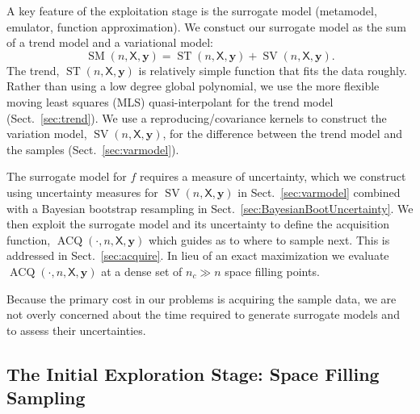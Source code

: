 \documentclass[11pt]{NSFamsart}
\DeclareMathOperator{\SURR}{SM} %
\DeclareMathOperator{\STREND}{ST} %
\DeclareMathOperator{\SVAR}{SV} %
\DeclareMathOperator{\VAL}{ACQ}
\newcommand{\mX}{\mathsf{X}}
\newcommand{\by}{{\boldsymbol{y}}}
\begin{document}
A key feature of the exploitation stage is the surrogate model (metamodel, emulator, function approximation). We constuct our surrogate model as the sum of a  trend model and a variational model:  
\begin{equation*}
    \SURR(n,\mX,\by) = \STREND(n,\mX,\by) + \SVAR(n,\mX,\by). 
\end{equation*} 
The trend, $\STREND(n,\mX,\by)$ is relatively simple function that fits the data roughly.  Rather than using a low degree global polynomial, we use the more flexible moving least squares (MLS) quasi-interpolant for the  trend model (Sect.\ \ref{sec:trend}).  We use a  reproducing/covariance kernels to construct the variation model,  $\SVAR(n,\mX,\by)$, for the difference between the trend model and the samples (Sect.\ \ref{sec:varmodel}).  

The surrogate model for $f$ requires a measure of uncertainty, which we construct using uncertainty measures for $\SVAR(n,\mX,\by)$ in Sect.\ \ref{sec:varmodel} combined with a Bayesian bootstrap resampling in Sect.\ \ref{sec:BayesianBootUncertainty}. We then exploit the surrogate model and its uncertainty to define the acquisition function, $\VAL(\cdot, n,\mX,\by)$  which guides as to where to sample next.  This is addressed in Sect.\ \ref{sec:acquire}.  In lieu of an exact maximization we evaluate  $\VAL(\cdot, n,\mX,\by)$ at a dense set of $n_c \gg n$ space filling points.

Because the primary  cost in our problems is acquiring the sample data, we are not overly concerned about the time required to generate surrogate models and to assess their uncertainties.


\subsection{The Initial Exploration Stage: Space Filling Sampling} \label{sec:Explore}
\end{document}
